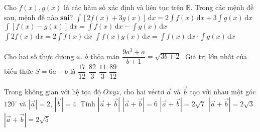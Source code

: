 \begin{ex}%
Cho $f(x),g(x)$ là các hàm số xác định và liên tục trên $\mathbb{R}$. Trong các mệnh đề sau, mệnh đề nào {\bf sai}?
\choice
{$\displaystyle \int \limits \left[2f(x)+3g(x)\right] \mathrm{\,d}x=2\displaystyle \int \limits f(x) \mathrm{\,d}x+3\displaystyle \int \limits g(x) \mathrm{\,d}x $}
{$\displaystyle \int \limits\left[f(x)-g(x)\right] \mathrm{\,d}x=\displaystyle \int \limits f(x) \mathrm{\,d}x-\displaystyle \int \limits g(x) \mathrm{\,d}x$}
{$\displaystyle \int \limits{2f(x) \mathrm{\,d}x=2}\displaystyle \int \limits f(x) \mathrm{\,d}x$}
{\True $\displaystyle \int \limits f(x)g(x) \mathrm{\,d}x=\displaystyle \int \limits f(x) \mathrm{\,d}x \cdot \displaystyle \int \limits g(x) \mathrm{\,d}x $}
\end{ex}
\begin{ex}%
Cho hai số thực dương $a,\;b$ thỏa mãn $\dfrac{9a^3+a}{b+1}=\sqrt{3b+2}$. Giá trị lớn nhất của biểu thức $S=6a-b$ là
\choice
{$\dfrac{17}{12}$}
{$\dfrac{82}{3}$}
{\True $\dfrac{11}{3}$}
{$\dfrac{89}{12}$}
\end{ex}
\begin{ex}%
Trong không gian với hệ tọa độ $Oxyz$, cho hai véctơ $\overrightarrow{a}$ và $\overrightarrow{b}$ tạo với nhau một góc $120^\circ $ và $\left| \overrightarrow{a}\right|=2$, $\left| \overrightarrow{b}\right|=4$. Tính $\left| \overrightarrow{a}+\overrightarrow{b}\right|$
\choice
{$\left| \overrightarrow{a}+\overrightarrow{b}\right|=6$}
{$\left| \overrightarrow{a}+\vec{b}\right|=2\sqrt{7}$}
{\True $\left| \overrightarrow{a}+\vec{b}\right|=2\sqrt{3}$}
{$\left| \overrightarrow{a}+\vec{b}\right|=2\sqrt{5}$}
\end{ex}
